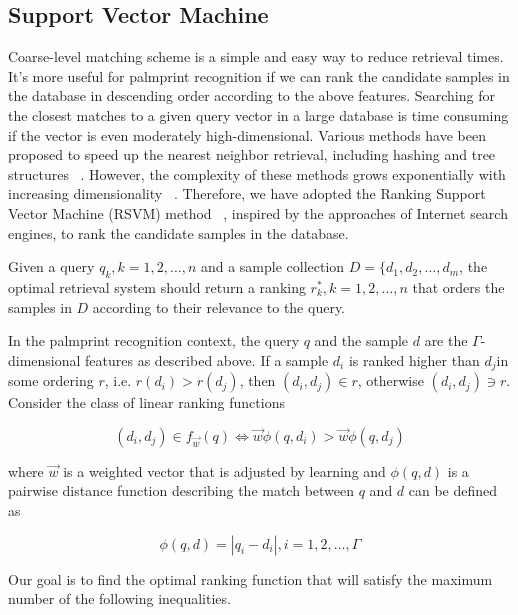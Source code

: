 \subsection{Support Vector Machine}
\label{ssec:methodology:svm}

Coarse-level matching scheme is a simple and easy way to reduce retrieval times. It’s more useful for palmprint recognition if we can rank the candidate samples in the database in descending order according to the above features. Searching for the closest matches to a given query vector in a large database is time consuming if the vector is even moderately high-dimensional. Various methods have been proposed to speed up the nearest neighbor retrieval, including hashing and tree structures ~\cite{Matei:2006tq}. However, the complexity of these methods grows exponentially with increasing dimensionality ~\cite{Chen:2009uy}. Therefore, we have adopted the Ranking Support Vector Machine (RSVM) method ~\cite{Joachims:2002cz}, inspired by the approaches of Internet search engines, to rank the candidate samples in the database.

Given a query $q_k, k=1,2,\dots,n$ and a sample collection $D=\{d_1,d_2,\dots,d_m$, the optimal retrieval system should return a ranking $r_k^*, k=1,2,\dots,n$ that orders the samples in $D$ according to their relevance to the query.

In the palmprint recognition context, the query $q$ and the sample $d$ are the $\Gamma$-dimensional features as described above. If a sample $d_i$ is ranked higher than $d_j$in some ordering $r$, i.e. $r(d_i)>r(d_j)$, then $(d_i,d_j)\in r$, otherwise $(d_i,d_j)\ni r$. Consider the class of linear ranking functions

\begin{equation}
(d_i,d_j) \in f_{\overrightarrow{w}}(q) \Leftrightarrow \overrightarrow{w}\phi(q,d_i)> \overrightarrow{w}\phi(q,d_j)
\end{equation}

where $\overrightarrow{w}$ is a weighted vector that is adjusted by learning and $\phi(q,d)$ is a pairwise distance function describing the match between $q$ and $d$ can be defined as

\begin{equation}
\phi(q,d)=|q_i-d_i|, i=1,2,\dots,\Gamma
\end{equation}

Our goal is to find the optimal ranking function that will satisfy the maximum number of the following inequalities.

